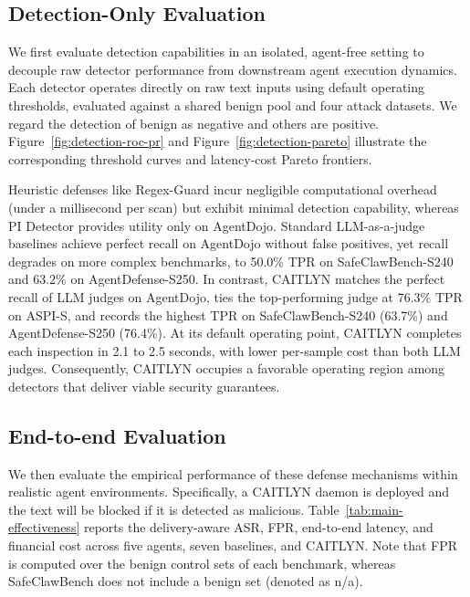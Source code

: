 


\subsection{Detection-Only Evaluation}
\label{sec:detection-only}

We first evaluate detection capabilities in an isolated, agent-free
setting to decouple raw detector performance from downstream agent
execution dynamics. Each detector operates directly on raw text inputs
using default operating thresholds, evaluated against a shared
benign pool and four attack datasets. We regard the detection of
benign as negative and others are
positive. Figure~\ref{fig:detection-roc-pr} and
Figure~\ref{fig:detection-pareto} illustrate the corresponding
threshold curves and latency-cost Pareto frontiers.

Heuristic defenses like Regex-Guard incur negligible computational
overhead (under a millisecond per scan) but exhibit minimal detection
capability, whereas PI Detector provides utility only on
AgentDojo. Standard LLM-as-a-judge baselines achieve perfect
recall on AgentDojo without false positives, yet recall degrades on
more complex benchmarks, to 50.0\% TPR on SafeClawBench-S240 and
63.2\% on AgentDefense-S250.
In contrast, CAITLYN matches the perfect recall of LLM judges
on AgentDojo, ties the top-performing judge at 76.3\% TPR on ASPI-S,
and records the highest TPR on SafeClawBench-S240 (63.7\%) and
AgentDefense-S250 (76.4\%). At its
default operating point, CAITLYN completes each inspection in
2.1 to 2.5 seconds, with lower per-sample cost than both LLM
judges. Consequently,
CAITLYN occupies a favorable operating region among detectors
that deliver viable security guarantees.

\subsection{End-to-end Evaluation}


We then evaluate the empirical performance of these defense mechanisms
within realistic agent
environments. Specifically, a CAITLYN daemon is deployed and the text
will be blocked if it is detected as malicious. Table~\ref{tab:main-effectiveness} reports the
delivery-aware ASR, FPR, end-to-end latency, and financial cost across
five agents, seven baselines, and CAITLYN. Note that FPR is computed
over the benign control sets of each benchmark, whereas SafeClawBench
does not include a benign set (denoted as n/a).

